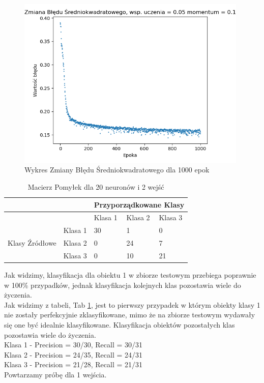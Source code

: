 \documentclass[12pt]{article}
\begin{document}
\begin{figure}[!ht]
 \centering
 \includegraphics[width=11cm]{WykresBlad20neuron2wejscia1.png}
 \caption{Wykres Zmiany Błędu Średniokwadratowego dla 1000 epok}
 \vspace{-0.1cm}
 \label{WykresBlad9}
\end{figure}
\newpage 


\begin{table}
\caption{\label{tab:tablica8} Macierz Pomyłek dla 20 neuronów i 2 wejść }
\begin{tabular}{ |p{3cm}|p{3cm}|p{2cm}|p{2cm}|p{2cm}|  }
 \hline
 & & 
 \multicolumn{3}{|c|}{Przyporządkowane Klasy} \\
 \hline

   & & Klasa 1 & Klasa 2 & Klasa 3\\
 \hline
\multirow{3}{4em}{Klasy Źródłowe}
   & Klasa 1 & 30 & 1 & 0 \\ 
   & Klasa 2 & 0 & 24 & 7 \\
   & Klasa 3 & 0 & 10 & 21 \\

 \hline
\end{tabular}
\end{table}
Jak widzimy, klasyfikacja dla obiektu 1 w zbiorze testowym przebiega poprawnie w 100\% przypadków, jednak klasyfikacja kolejnych klas pozostawia wiele do życzenia. \\
Jak widzimy z tabeli, Tab \ref{tab:tablica8}, jest to pierwszy przypadek w którym obiekty klasy 1 nie zostały perfekcyjnie zklasyfikowane, mimo że na zbiorze testowym wydawały się one być idealnie klasyfikowane. Klasyfikacja obiektów pozostałych klas pozostawia wiele do życzenia.
\\Klasa 1 - Precision = 30/30, Recall = 30/31\\
Klasa 2 - Precision = 24/35, Recall = 24/31\\
Klasa 3 - Precision = 21/28, Recall = 21/31\\
 Powtarzamy próbę dla 1 wejścia.
\end{document}
